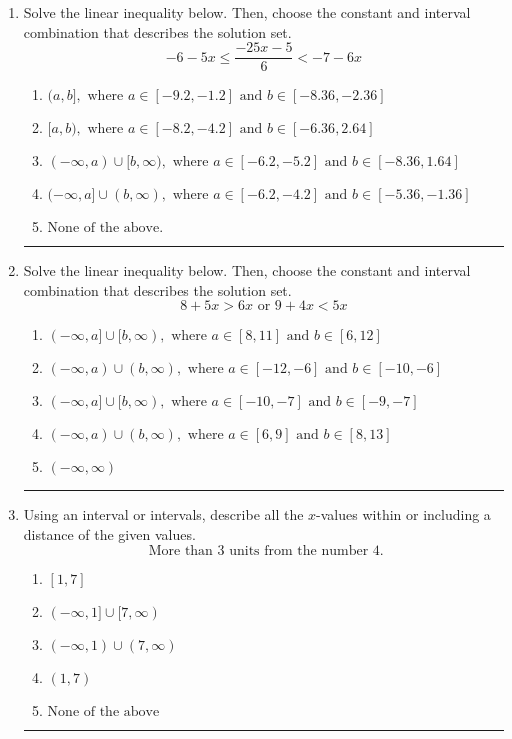 \documentclass[14pt]{extbook}
\newcommand{\litem}[1]{\item#1\hspace*{-1cm}\rule{\textwidth}{0.4pt}}
\begin{document}
\begin{enumerate}
{\begin{enumerate}[label=\Alph*.]
\end{enumerate} }
\litem{
Solve the linear inequality below. Then, choose the constant and interval combination that describes the solution set.\[ -6 - 5 x \leq \frac{-25 x - 5}{6} < -7 - 6 x \]\begin{enumerate}[label=\Alph*.]
\item \( (a, b], \text{ where } a \in [-9.2, -1.2] \text{ and } b \in [-8.36, -2.36] \)
\item \( [a, b), \text{ where } a \in [-8.2, -4.2] \text{ and } b \in [-6.36, 2.64] \)
\item \( (-\infty, a) \cup [b, \infty), \text{ where } a \in [-6.2, -5.2] \text{ and } b \in [-8.36, 1.64] \)
\item \( (-\infty, a] \cup (b, \infty), \text{ where } a \in [-6.2, -4.2] \text{ and } b \in [-5.36, -1.36] \)
\item \( \text{None of the above.} \)

\end{enumerate} }
\litem{
Solve the linear inequality below. Then, choose the constant and interval combination that describes the solution set.\[ 8 + 5 x > 6 x \text{ or } 9 + 4 x < 5 x \]\begin{enumerate}[label=\Alph*.]
\item \( (-\infty, a] \cup [b, \infty), \text{ where } a \in [8, 11] \text{ and } b \in [6, 12] \)
\item \( (-\infty, a) \cup (b, \infty), \text{ where } a \in [-12, -6] \text{ and } b \in [-10, -6] \)
\item \( (-\infty, a] \cup [b, \infty), \text{ where } a \in [-10, -7] \text{ and } b \in [-9, -7] \)
\item \( (-\infty, a) \cup (b, \infty), \text{ where } a \in [6, 9] \text{ and } b \in [8, 13] \)
\item \( (-\infty, \infty) \)

\end{enumerate} }
\litem{
Using an interval or intervals, describe all the $x$-values within or including a distance of the given values.\[ \text{ More than } 3 \text{ units from the number } 4. \]\begin{enumerate}[label=\Alph*.]
\item \( [1, 7] \)
\item \( (-\infty, 1] \cup [7, \infty) \)
\item \( (-\infty, 1) \cup (7, \infty) \)
\item \( (1, 7) \)
\item \( \text{None of the above} \)


\end{enumerate}}
\end{enumerate}
\end{document}
